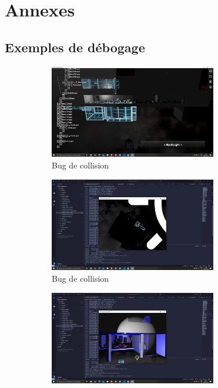 \newpage
\section{Annexes}

\printglossaries
\printnomenclature


\subsection{Exemples de débogage}

\begin{figure}[H]
    \begin{subfigure}{0.5\textwidth}
        \centering
        \includegraphics[width=0.8\textwidth]{images/gdb_editeur.png}
        \caption{Bug de collision}
        \label{fig:editeur1}
    \end{subfigure}
    \begin{subfigure}{0.5\textwidth}
        \centering
        \includegraphics[width=0.8\textwidth]{images/gdb_editeur2.png}
        \caption{Bug de collision}
        \label{fig:editeur2}
    \end{subfigure}
    \begin{subfigure}{0.5\textwidth}
        \centering
        \includegraphics[width=0.8\textwidth]{images/gdb_editeur3.png}

\end{subfigure}
\end{figure}
